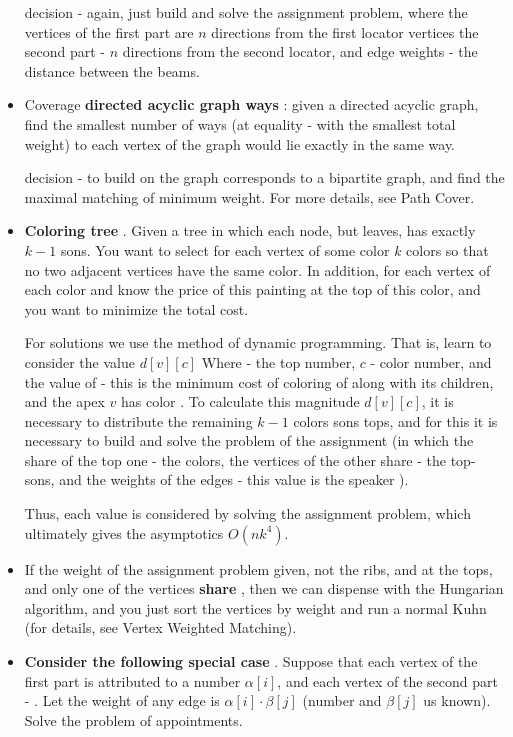 \begin{itemize}
decision - again, just build and solve the assignment problem, where the vertices of the first part are $n$ directions from the first locator vertices the second part - $n$ directions from the second locator, and edge weights - the distance between the beams.

\item Coverage \textbf{ directed acyclic graph ways }: given a directed acyclic graph, find the smallest number of ways (at equality - with the smallest total weight) to each vertex of the graph would lie exactly in the same way.

decision - to build on the graph corresponds to a bipartite graph, and find the maximal matching of minimum weight. For more details, see Path Cover.

\item \textbf{ Coloring tree }. Given a tree in which each node, but leaves, has exactly $k-1$ sons. You want to select for each vertex of some color $k$ colors so that no two adjacent vertices have the same color. In addition, for each vertex of each color and know the price of this painting at the top of this color, and you want to minimize the total cost.

For solutions we use the method of dynamic programming. That is, learn to consider the value $d[v][c]$ Where   - the top number, $c$ - color number, and the value of - this is the minimum cost of coloring of  along with its children, and the apex $v$ has color . To calculate this magnitude $d[v][c]$, it is necessary to distribute the remaining $k-1$ colors sons tops, and for this it is necessary to build and solve the problem of the assignment (in which the share of the top one - the colors, the vertices of the other share - the top-sons, and the weights of the edges - this value is the speaker  ).

Thus, each value  is considered by solving the assignment problem, which ultimately gives the asymptotics $O(nk^4)$.

\item If the weight of the assignment problem given, not the ribs, and at the tops, and only one of the vertices \textbf{ share }, then we can dispense with the Hungarian algorithm, and you just sort the vertices by weight and run a normal Kuhn (for details, see Vertex Weighted Matching).

\item \textbf{ Consider the following special case }. Suppose that each vertex of the first part is attributed to a number $\alpha[i]$, and each vertex of the second part - . Let the weight of any edge  is $\alpha[i] \cdot \beta[j]$ (number  and $\beta[j]$ us known). Solve the problem of appointments.


\end{itemize}
